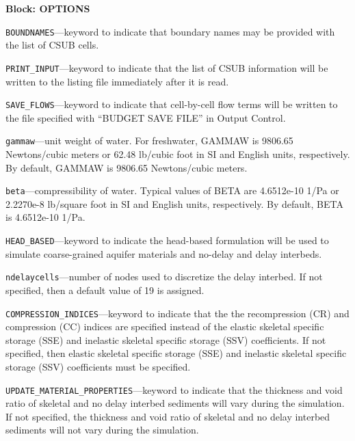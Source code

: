
\item \textbf{Block: OPTIONS}

\begin{description}
\item \texttt{BOUNDNAMES}---keyword to indicate that boundary names may be provided with the list of CSUB cells.

\item \texttt{PRINT\_INPUT}---keyword to indicate that the list of CSUB information will be written to the listing file immediately after it is read.

\item \texttt{SAVE\_FLOWS}---keyword to indicate that cell-by-cell flow terms will be written to the file specified with ``BUDGET SAVE FILE'' in Output Control.

\item \texttt{gammaw}---unit weight of water. For freshwater, GAMMAW is 9806.65 Newtons/cubic meters or 62.48 lb/cubic foot in SI and English units, respectively. By default, GAMMAW is 9806.65 Newtons/cubic meters.

\item \texttt{beta}---compressibility of water. Typical values of BETA are 4.6512e-10 1/Pa or 2.2270e-8 lb/square foot in SI and English units, respectively. By default, BETA is 4.6512e-10 1/Pa.

\item \texttt{HEAD\_BASED}---keyword to indicate the head-based formulation will be used to simulate coarse-grained aquifer materials and no-delay and delay interbeds.

\item \texttt{ndelaycells}---number of nodes used to discretize the delay interbed. If not specified, then a default value of 19 is assigned.

\item \texttt{COMPRESSION\_INDICES}---keyword to indicate that the the recompression (CR) and compression (CC) indices are specified instead of the elastic skeletal specific storage (SSE) and inelastic skeletal specific storage (SSV) coefficients. If not specified, then elastic skeletal specific storage (SSE) and inelastic skeletal specific storage (SSV) coefficients must be specified.

\item \texttt{UPDATE\_MATERIAL\_PROPERTIES}---keyword to indicate that the thickness and void ratio of skeletal and no delay interbed sediments will vary during the simulation. If not specified, the thickness and void ratio of skeletal and no delay interbed sediments will not vary during the simulation.


\end{description}
